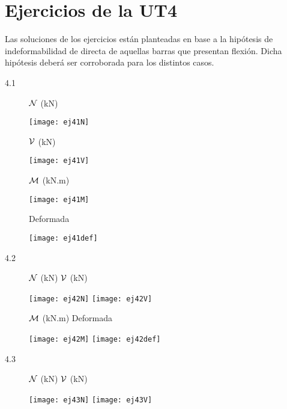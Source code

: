 \section{Ejercicios de la UT4}

Las soluciones de los ejercicios están planteadas en base a la hipótesis de indeformabilidad de directa de aquellas barras que presentan flexión. Dicha hipótesis deberá ser corroborada para los distintos casos.


\begin{description}

\item[4.1] 

${\mathcal N}$ (kN)
\begin{center}
	\texttt{[image: ej41N]}
\end{center}


${\mathcal V}$ (kN)
\begin{center}
	\texttt{[image: ej41V]}
\end{center}

${\mathcal M}$ (kN.m)
\begin{center}
	\texttt{[image: ej41M]}
\end{center}


Deformada
\begin{center}
	\texttt{[image: ej41def]}
\end{center}



\item[4.2] 
\qquad \qquad
${\mathcal N}$ (kN) \hspace{0.5\textwidth} ${\mathcal V}$ (kN)
\begin{center}
	\texttt{[image: ej42N]}
	\texttt{[image: ej42V]}
\end{center}

\qquad \qquad
${\mathcal M}$ (kN.m)  \hspace{0.5\textwidth} Deformada
\begin{center}
	\texttt{[image: ej42M]}
	\texttt{[image: ej42def]}
\end{center}


\item[4.3] 

${\mathcal N}$ (kN) \hspace{0.4\textwidth} ${\mathcal V}$ (kN)
\begin{center}
	\texttt{[image: ej43N]}
	\texttt{[image: ej43V]}
\end{center}


\end{description}
